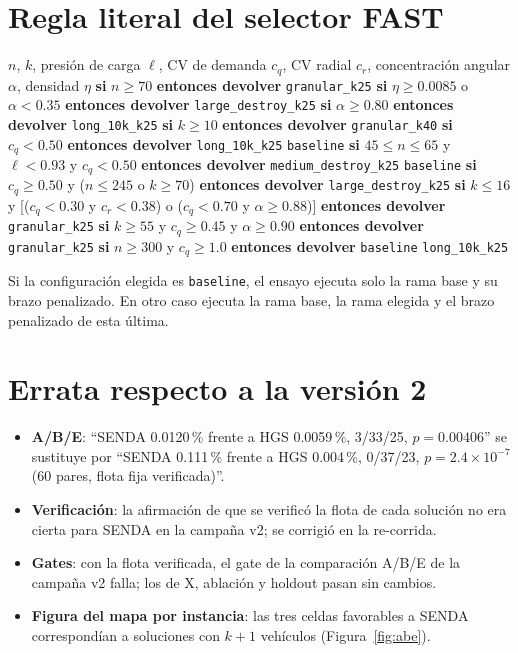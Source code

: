 \documentclass[11pt,a4paper]{article}
\newcommand{\SiDevolver}[2]{\State \textbf{si} #1 \textbf{entonces devolver} #2}
\newcommand{\tsl}[1]{\texttt{\small #1}}
\begin{document}
\section{Regla literal del selector FAST}
\label{app:selector}

\begin{algorithm}[H]
\caption{Configuración adicional elegida por FAST a partir de $\phi(I)$}
\begin{algorithmic}[1]
\Require $n$, $k$, presión de carga $\ell$, CV de demanda $c_q$, CV radial $c_r$, concentración angular $\alpha$, densidad $\eta$
  \SiDevolver{$n\ge70$}{\tsl{granular\_k25}}
    \SiDevolver{$\eta\ge0.0085$ o $\alpha<0.35$}{\tsl{large\_destroy\_k25}}
    \SiDevolver{$\alpha\ge0.80$}{\tsl{long\_10k\_k25}}
    \SiDevolver{$k\ge10$}{\tsl{granular\_k40}}
    \SiDevolver{$c_q<0.50$}{\tsl{long\_10k\_k25}}
    \State \Return \tsl{baseline}
  \EndIf
  \SiDevolver{$45\le n\le65$ y $\ell<0.93$ y $c_q<0.50$}{\tsl{medium\_destroy\_k25}}
  \State \Return \tsl{baseline}
\EndIf
\SiDevolver{$c_q\ge0.50$ y ($n\le245$ o $k\ge70$)}{\tsl{large\_destroy\_k25}}
\SiDevolver{$k\le16$ y [($c_q<0.30$ y $c_r<0.38$) o ($c_q<0.70$ y $\alpha\ge0.88$)]}{\tsl{granular\_k25}}
\SiDevolver{$k\ge55$ y $c_q\ge0.45$ y $\alpha\ge0.90$}{\tsl{granular\_k25}}
\SiDevolver{$n\ge300$ y $c_q\ge1.0$}{\tsl{baseline}}
\State \Return \tsl{long\_10k\_k25}
\end{algorithmic}
\end{algorithm}

\noindent Si la configuración elegida es \tsl{baseline}, el ensayo ejecuta solo la rama base y su
brazo penalizado. En otro caso ejecuta la rama base, la rama elegida y el brazo penalizado de esta
última.

\section{Errata respecto a la versión 2}
\label{app:errata}
\begin{itemize}[leftmargin=1.5em]
\item \textbf{A/B/E}: ``SENDA 0.0120\,\% frente a HGS 0.0059\,\%, 3/33/25, $p=0.00406$'' se sustituye
por ``SENDA 0.111\,\% frente a HGS 0.004\,\%, 0/37/23, $p=2.4\times10^{-7}$ (60 pares, flota fija
verificada)''.
\item \textbf{Verificación}: la afirmación de que se verificó la flota de cada solución no era cierta
para SENDA en la campaña v2; se corrigió en la re-corrida.
\item \textbf{Gates}: con la flota verificada, el gate de la comparación A/B/E de la campaña v2 falla;
los de X, ablación y holdout pasan sin cambios.
\item \textbf{Figura del mapa por instancia}: las tres celdas favorables a SENDA correspondían a
soluciones con $k+1$ vehículos (Figura~\ref{fig:abe}).
\end{itemize}
\end{document}
